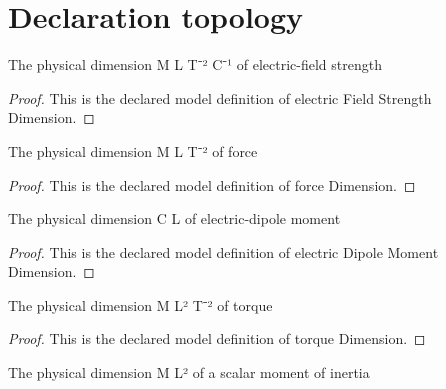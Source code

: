 \section{Declaration topology}
\begin{definition}
  \label{def:physics:phyx-mini-0910:phyxminiproblems-problemphyxmini0910-electricfieldstrengthdimension}
  The physical dimension M L T⁻² C⁻¹ of electric-field strength
\end{definition}
\begin{proof}
  This is the declared model definition of electric Field Strength Dimension.
\end{proof}
\begin{definition}
  \label{def:physics:phyx-mini-0910:phyxminiproblems-problemphyxmini0910-forcedimension}
  The physical dimension M L T⁻² of force
\end{definition}
\begin{proof}
  This is the declared model definition of force Dimension.
\end{proof}
\begin{definition}
  \label{def:physics:phyx-mini-0910:phyxminiproblems-problemphyxmini0910-electricdipolemomentdimension}
  The physical dimension C L of electric-dipole moment
\end{definition}
\begin{proof}
  This is the declared model definition of electric Dipole Moment Dimension.
\end{proof}
\begin{definition}
  \label{def:physics:phyx-mini-0910:phyxminiproblems-problemphyxmini0910-torquedimension}
  The physical dimension M L² T⁻² of torque
\end{definition}
\begin{proof}
  This is the declared model definition of torque Dimension.
\end{proof}
\begin{definition}
  \label{def:physics:phyx-mini-0910:phyxminiproblems-problemphyxmini0910-momentofinertiadimension}
  The physical dimension M L² of a scalar moment of inertia
\end{definition}
